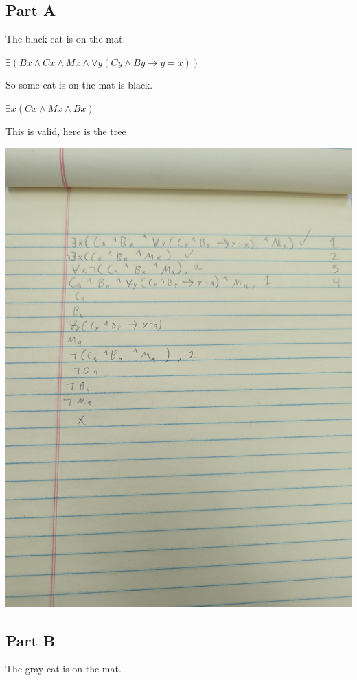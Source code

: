 \documentclass[12pt]{article}
\begin{document}
\subsection*{Part A}

The black cat is on the mat. 

$\exists (Bx \land Cx \land Mx \land \forall y (Cy \land By \rightarrow y = x))$

So some cat is on the mat is black.

$\exists x (Cx \land Mx \land Bx)$

This is valid, here is the tree

\includegraphics[width=\textwidth]{3a}

\subsection*{Part B}

The gray cat is on the mat. 
\end{document}
